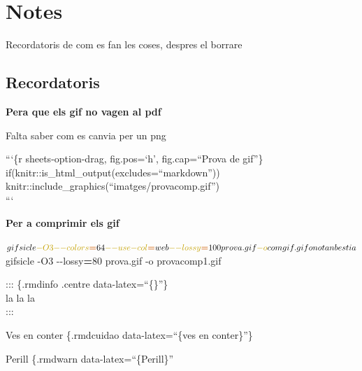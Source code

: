 \documentclass[
  10pt,
]{krantz}
\newenvironment{Shaded}{\begin{snugshade}}{\end{snugshade}}
\newcommand{\AttributeTok}[1]{\textcolor[rgb]{0.77,0.63,0.00}{#1}}
\newcommand{\ExtensionTok}[1]{#1}
\newcommand{\NormalTok}[1]{#1}
\newcommand{\OperatorTok}[1]{\textcolor[rgb]{0.81,0.36,0.00}{\textbf{#1}}}
\begin{document}
\hypertarget{notes}{%
\chapter{Notes}\label{notes}}

Recordatoris de com es fan les coses, despres el borrare

\hypertarget{recordatoris}{%
\section{Recordatoris}\label{recordatoris}}

\textbf{Pera que els gif no vagen al pdf}

Falta saber com es canvia per un png

```\{r sheets-option-drag, fig.pos=`h', fig.cap=``Prova de gif''\}\\
if(knitr::is\_html\_output(excludes=``markdown'')) knitr::include\_graphics(``imatges/provacomp.gif'')\\
```

\textbf{Per a comprimir els gif}

\begin{Shaded}
\begin{Highlighting}[]
\ExtensionTok{$}\NormalTok{ gifsicle }\AttributeTok{{-}O3} \AttributeTok{{-}{-}colors}\OperatorTok{=}\NormalTok{64 }\AttributeTok{{-}{-}use{-}col}\OperatorTok{=}\NormalTok{web }\AttributeTok{{-}{-}lossy}\OperatorTok{=}\NormalTok{100 prova.gif }\AttributeTok{{-}o}\NormalTok{ comgif.gif  }
\ExtensionTok{o}\NormalTok{ no tan bestia  }
\ExtensionTok{$}\NormalTok{ gifsicle }\AttributeTok{{-}O3} \AttributeTok{{-}{-}lossy}\OperatorTok{=}\NormalTok{80 prova.gif }\AttributeTok{{-}o}\NormalTok{ provacomp1.gif  }
\end{Highlighting}
\end{Shaded}

\begin{rmdinfo}{}
::: \{.rmdinfo .centre data-latex=``\{\}''\}\\
la la la\\
:::

\end{rmdinfo}

\begin{rmdcuidao}{Ves en conter}
\{.rmdcuidao data-latex=``\{ves en conter\}''\}

\end{rmdcuidao}

\begin{rmdwarn}{Perill}
\{.rmdwarn data-latex=``\{Perill\}''

\end{rmdwarn}
\end{document}
